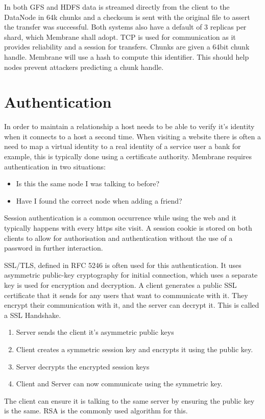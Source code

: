\documentclass[a4paper, 11pt, twocolumn, twoside]{report}
\begin{document}
In both GFS and HDFS data is streamed directly from the client to the DataNode in 64k chunks and a checksum is sent with the original file to assert the transfer was successful. Both systems also have a default of 3 replicas per shard, which Membrane shall adopt. TCP is used for communication as it provides reliability and a session for transfers. Chunks are given a 64bit chunk handle. Membrane will use a hash to compute this identifier. This should help nodes prevent attackers predicting a chunk handle.

\section{Authentication}

In order to maintain a relationship a host needs to be able to verify it's identity when it connects to a host a second time. When visiting a website there is often a need to map a virtual identity to a real identity of a service user \citep{hericourt2001method} a bank for example, this is typically done using a certificate authority. Membrane requires authentication in two situations:
\begin{itemize}
 \item Is this the same node I was talking to before?
 \item Have I found the correct node when adding a friend?
\end{itemize}
Session authentication is a common occurrence while using the web and it typically happens with every https site visit. A session cookie is stored on both clients to allow for authorisation and authentication without the use of a password in further interaction. \citep{mayo2008security}

SSL/TLS, defined in RFC 5246 \citep{dierks2008transport} is often used for this authentication. It uses asymmetric public-key cryptography for initial connection, which uses a separate key is used for encryption and decryption. A client generates a public SSL certificate that it sends for any users that want to communicate with it. They encrypt their communication with it, and the server can decrypt it. This is called a SSL Handshake.
\begin{enumerate}
 \item Server sends the client it's asymmetric public keys
 \item Client creates a symmetric session key and encrypts it using the public key.
 \item Server decrypts the encrypted session keys
 \item Client and Server can now communicate using the symmetric key.
\end{enumerate}
The client can ensure it is talking to the same server by ensuring the public key is the same. RSA is the commonly used algorithm for this.
\end{document}
